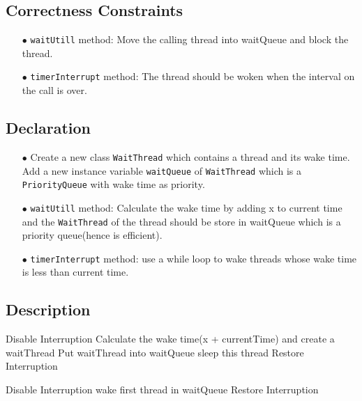 \documentclass{article}
\begin{document}
\subsection{Correctness Constraints}
\begin{enumerate}
	\item[$\bullet$] \texttt{waitUtill} method: Move the calling thread into waitQueue and block the thread. 
	\item[$\bullet$] \texttt{timerInterrupt} method: The thread should be woken when the interval on the call is over.
\end{enumerate}
\subsection{Declaration}
\begin{enumerate}
	\item[$\bullet$] Create a new class \texttt{WaitThread} which contains a thread and its wake time. 
Add a new instance variable \texttt{waitQueue} of \texttt{WaitThread} which is a \texttt{PriorityQueue} with wake time as priority. 
	\item[$\bullet$] \texttt{waitUtill} method: Calculate the wake time by adding x to current time and the \texttt{WaitThread} of the thread
		should be store in waitQueue which is a priority queue(hence is efficient).
	\item[$\bullet$] \texttt{timerInterrupt} method: use a while loop to wake threads whose wake time is less than current time.
\end{enumerate}
\subsection{Description}
\begin{algorithm}
  \begin{algorithmic}
			\State Disable Interruption
			\State Calculate the wake time(x + currentTime) and create a waitThread
			\State Put waitThread into waitQueue
			\State sleep this thread
			\State Restore Interruption
		\EndProcedure
  \end{algorithmic}
	\begin{algorithmic}
			\State Disable Interruption
					\State wake first thread in waitQueue
			\EndWhile
			\State Restore Interruption
		\EndProcedure
  \end{algorithmic}
\end{algorithm}
\end{document}

